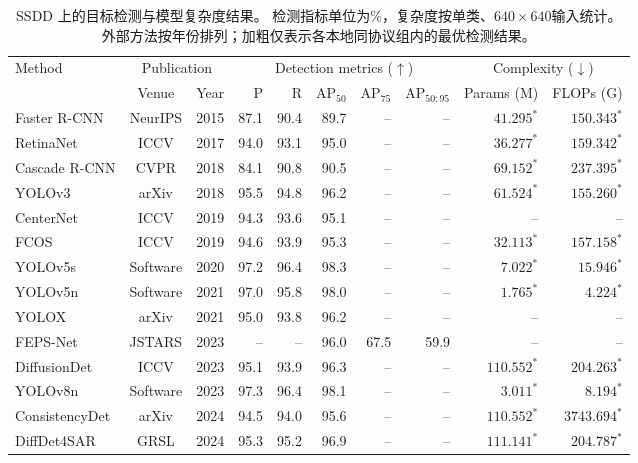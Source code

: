 \documentclass[journal]{IEEEtran}
\begin{document}
\begin{table}[!t]
\centering
\scriptsize
\setlength{\tabcolsep}{3pt}
\renewcommand{\arraystretch}{1.10}
\caption{SSDD 上的目标检测与模型复杂度结果。
检测指标单位为\%，复杂度按单类、$640\times640$输入统计。
外部方法按年份排列；加粗仅表示各本地同协议组内的最优检测结果。}
\label{tab:ssdd_detection_comparison}
\begin{tabular*}{\textwidth}{@{\extracolsep{\fill}}lccrrrrrrr}
\toprule
\multirow{2}{*}{Method}
& \multicolumn{2}{c}{Publication}
& \multicolumn{5}{c}{Detection metrics ($\uparrow$)}
& \multicolumn{2}{c}{Complexity ($\downarrow$)} \\
\cmidrule(lr){2-3}\cmidrule(lr){4-8}\cmidrule(lr){9-10}
& Venue & Year & P & R & AP$_{50}$ & AP$_{75}$ & AP$_{50:95}$
& Params (M) & FLOPs (G) \\
\midrule
Faster R-CNN
& NeurIPS & 2015
& 87.1 & 90.4 & 89.7 & -- & -- & $41.295^{*}$ & $150.343^{*}$ \\
RetinaNet
& ICCV & 2017
& 94.0 & 93.1 & 95.0 & -- & -- & $36.277^{*}$ & $159.342^{*}$ \\
Cascade R-CNN
& CVPR & 2018
& 84.1 & 90.8 & 90.5 & -- & -- & $69.152^{*}$ & $237.395^{*}$ \\
YOLOv3
& arXiv & 2018
& 95.5 & 94.8 & 96.2 & -- & -- & $61.524^{*}$ & $155.260^{*}$ \\
CenterNet
& ICCV & 2019
& 94.3 & 93.6 & 95.1 & -- & -- & -- & -- \\
FCOS
& ICCV & 2019
& 94.6 & 93.9 & 95.3 & -- & -- & $32.113^{*}$ & $157.158^{*}$ \\
YOLOv5s
& Software & 2020
& 97.2 & 96.4 & 98.3 & -- & -- & $7.022^{*}$ & $15.946^{*}$ \\
YOLOv5n
& Software & 2021
& 97.0 & 95.8 & 98.0 & -- & -- & $1.765^{*}$ & $4.224^{*}$ \\
YOLOX
& arXiv & 2021
& 95.0 & 93.8 & 96.2 & -- & -- & -- & -- \\
FEPS-Net~\cite{feps2023}
& JSTARS & 2023
& -- & -- & 96.0 & 67.5 & 59.9 & -- & -- \\
DiffusionDet~\cite{diffusiondet2023}
& ICCV & 2023
& 95.1 & 93.9 & 96.3 & -- & -- & $110.552^{*}$ & $204.263^{*}$ \\
YOLOv8n~\cite{yolov82023}
& Software & 2023
& 97.3 & 96.4 & 98.1 & -- & -- & $3.011^{*}$ & $8.194^{*}$ \\
ConsistencyDet
& arXiv & 2024
& 94.5 & 94.0 & 95.6 & -- & -- & $110.552^{*}$ & $3743.694^{*}$ \\
DiffDet4SAR~\cite{diffdet4sar2024}
& GRSL & 2024
& 95.3 & 95.2 & 96.9 & -- & -- & $111.141^{*}$ & $204.787^{*}$ \\

\end{tabular*}
\end{table}
\end{document}
